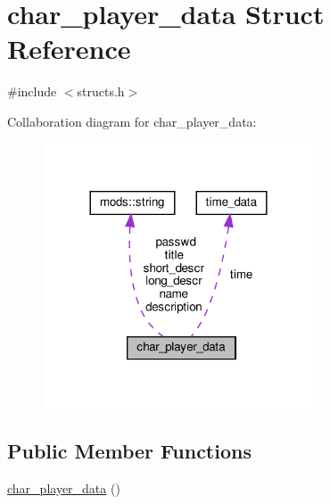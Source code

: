 \hypertarget{structchar__player__data}{}\section{char\+\_\+player\+\_\+data Struct Reference}
\label{structchar__player__data}


{\ttfamily \#include $<$structs.\+h$>$}



Collaboration diagram for char\+\_\+player\+\_\+data\+:\nopagebreak
\begin{figure}[H]
\begin{center}
\leavevmode
\includegraphics[width=228pt]{structchar__player__data__coll__graph}
\end{center}
\end{figure}
\subsection*{Public Member Functions}
\begin{DoxyCompactItemize}
\item 
\hyperlink{structchar__player__data_af63d02e377ae646aaf4f7eaa13de601c}{char\+\_\+player\+\_\+data} ()
\end{DoxyCompactItemize}
